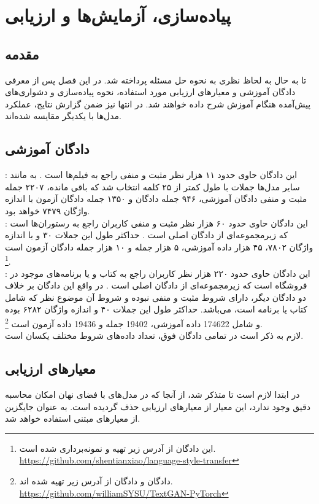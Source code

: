 \chapter{پیاده‌سازی، آزمایش‌ها و ارزیابی}\label{chap4}
\minitoc
\section{مقدمه}
تا به حال به لحاظ نظری به نحوه حل مسئله پرداخته شد. در این فصل پس از معرفی دادگان آموزشی و معیارهای ارزیابی مورد استفاده، نحوه پیاده‌سازی و دشواری‌های پیش‌آمده هنگام آموزش شرح داده خواهند شد. در انتها نیز ضمن گزارش نتایج، عملکرد مدل‌ها با یکدیگر مقایسه شده‌اند.
\section{دادگان آموزشی} \label{chap4:dataset}
:
این دادگان حاوی حدود ۱۱ هزار نظر مثبت و منفی راجع به فیلم‌ها است \cite{sst}. به مانند سایر مدل‌ها جملات با طول کمتر از ۲۵ کلمه انتخاب شد که باقی مانده، ۲۲۰۷ جمله مثبت و منفی دادگان آموزشی، ۹۴۶ جمله دادگان \validation{} و ۱۳۵۰ جمله دادگان آزمون با اندازه واژگان ۷۴۷۹ خواهد بود.
\\
:
این دادگان حاوی حدود ۶۰ هزار نظر مثبت و منفی کاربران راجع به رستوران‌ها است که زیرمجموعه‌ای از دادگان اصلی است
.
حداکثر طول این جملات ۳۰ و با اندازه واژگان ۷۸۰۲، ۴۵ هزار داده آموزشی، ۵ هزار جمله \validation{} و ۱۰ هزار جمله دادگان آزمون است
\footnote{
	این دادگان از آدرس زیر تهیه و نمونه‌برداری شده است.
	\\
	\url{https://github.com/shentianxiao/language-style-transfer}}.
\\
:
این دادگان حاوی حدود ۲۲۰ هزار نظر کاربران راجع به کتاب و یا برنامه‌های موجود در فروشگاه  است که زیرمجموعه‌ای از دادگان اصلی است \cite{amazon_review}. در واقع این دادگان بر خلاف دو دادگان دیگر، دارای شروط مثبت و منفی نبوده و شروط آن موضوع نظر که شامل کتاب یا برنامه است، می‌باشد. حداکثر طول این جملات ۴۰ و اندازه واژگان ۶۲۸۲ بوده و شامل 174622 داده آموزشی، 19402 جمله \validation{} و 19436 داده آزمون است
\footnote{
	دادگان \amazon{} و دادگان \sst{} از آدرس زیر تهیه شده اند.
	\\
	\url{https://github.com/williamSYSU/TextGAN-PyTorch}}.
\\
لازم به ذکر است در تمامی دادگان فوق، تعداد داده‌های شروط مختلف یکسان است.
\section{معیارهای ارزیابی} \label{chap4:metrics}
در ابتدا لازم است تا متذکر شد، از آنجا که در مدل‌های با فضای نهان امکان محاسبه دقیق \likelihood{} وجود ندارد، این معیار از معیارهای ارزیابی حذف گردیده است. به عنوان جایگزین از معیار‌های مبتنی \ngramphrase{} استفاده خواهد شد.
